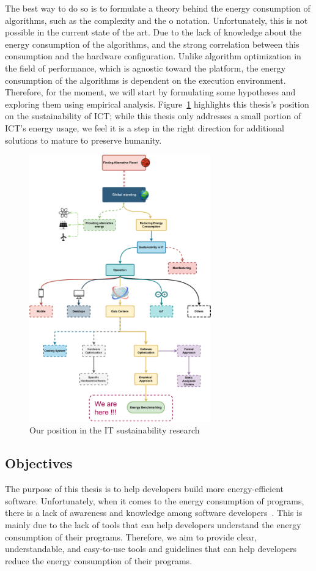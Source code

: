 The best way to do so is to formulate a theory behind the energy consumption of algorithms, such as the complexity and the o notation.
Unfortunately, this is not possible in the current state of the art.
Due to the lack of knowledge about the energy consumption of the algorithms, and the strong correlation between this consumption and the hardware configuration.
Unlike algorithm optimization in the field of performance, which is agnostic toward the platform, the energy consumption of the algorithms is dependent on the execution environment.
Therefore, for the moment, we will start by formulating some hypotheses and exploring them using empirical analysis.
Figure~\ref{fig:thesis_position} highlights this thesis's position on the sustainability of ICT\@; while this thesis only addresses a small portion of ICT's energy usage, we feel it is a step in the right direction for additional solutions to mature to preserve humanity.

\begin{figure}[!h]
    \centering
    \includegraphics[width=0.7\textwidth,height=\textheight,keepaspectratio]{chapters/thesis_position.pdf}
    \caption{Our position in the IT sustainability research}
    \label{fig:thesis_position}
\end{figure}
\subsection{Objectives}
The purpose of this thesis is to help developers build more energy-efficient software.
Unfortunately, when it comes to the energy consumption of programs, there is a lack of awareness and knowledge among software developers~\cite{ournani2020reducing,pang2015programmers,pinto2014mining}.
This is mainly due to the lack of tools that can help developers understand the energy consumption of their programs.
Therefore, we aim to provide clear, understandable, and easy-to-use tools and guidelines that can help developers reduce the energy consumption of their programs.

